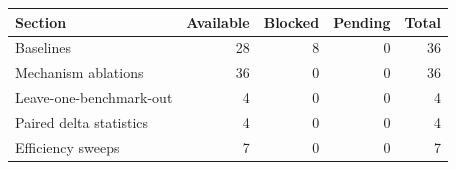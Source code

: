 \begin{tabular}{lrrrr}
\toprule
Section & Available & Blocked & Pending & Total \\
\midrule
Baselines & 28 & 8 & 0 & 36 \\
Mechanism ablations & 36 & 0 & 0 & 36 \\
Leave-one-benchmark-out & 4 & 0 & 0 & 4 \\
Paired delta statistics & 4 & 0 & 0 & 4 \\
Efficiency sweeps & 7 & 0 & 0 & 7 \\
\bottomrule
\end{tabular}
